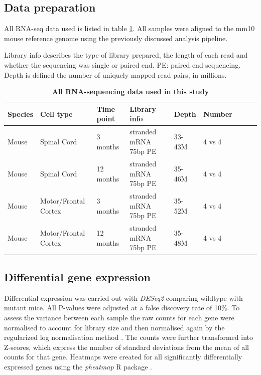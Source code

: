 \subsection{Data preparation}
All RNA-seq data used is listed in table \ref{table:fus_mice_rnaseq}. All samples were aligned to the mm10 mouse reference genome using the previously discussed analysis pipeline.


\begin{table}[h!]
	\caption{\textbf{All RNA-sequencing data used in this study}}
	Library info describes the type of library prepared, the length of each read and whether the sequencing was single or paired end. PE: paired end sequencing. Depth is defined the number of uniquely mapped read pairs, in millions.
	\label{table:fus_mice_rnaseq}
	\begin{center}
		\begin{small}
			\begin{tabular}{llllp{1.5cm}llll}
				Species & Cell type & Time point & Library info & Depth & Number\\
				\hline
				Mouse & Spinal Cord & 3 months & stranded mRNA 75bp PE & 33-43M & 4 vs 4\\
				Mouse & Spinal Cord & 12 months & stranded mRNA 75bp PE & 35-46M & 4 vs 4\\ 
				Mouse & Motor/Frontal Cortex & 3 months & stranded mRNA 75bp PE & 35-52M & 4 vs 4\\
				Mouse & Motor/Frontal Cortex & 12 months & stranded mRNA 75bp PE & 35-48M & 4 vs 4\\ 
			\end{tabular}
		\end{small}
	\end{center}
\end{table}

\subsection{Differential gene expression}
Differential expression was carried out with \textit{DESeq2} \citep{Love2014} comparing wildtype with mutant mice. All P-values were adjusted at a false discovery rate of 10\%. To assess the variance between each sample the raw counts for each gene were normalised to account for library size and then normalised again by the regularized log normalisation method \citep{Love2014}. The counts were further transformed into Z-scores, which express the number of standard deviations from the mean of all counts for that gene. Heatmaps were created for all significantly differentially expressed genes using the \textit{pheatmap} R package \citep{Kolde2012}.  

